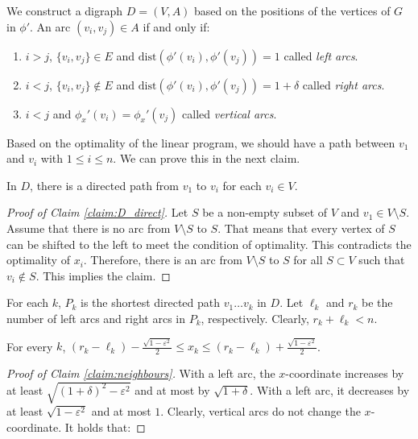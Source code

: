 {We construct a digraph $D = (V,A)$ based on the positions of the vertices of $G$ in $\phi'$. An arc $(v_i, v_j) \in A$ if and only if:

\begin{enumerate}
  \item $i > j$, $\{v_i, v_j\} \in E$ and $\text{dist}(\phi'(v_i), \phi'(v_j)) = 1$ called \emph{left arcs}.
  \item $i < j$, $\{v_i, v_j\} \notin E$ and $\text{dist}(\phi'(v_i), \phi'(v_j)) = 1 + \delta$ called \emph{right arcs}.
  \item $i < j$ and $\phi_x'(v_i) = \phi_x'(v_j)$ called \emph{vertical arcs}.
\end{enumerate}

Based on the optimality of the linear program, we should have a path between $v_1$ and $v_i$ with $1 \leq i \leqslant n$. We can prove this in the next claim.

\begin{claim}\label{claim:D_direct}
  In $D$, there is a directed path from $v_1$ to $v_i$ for each $v_i \in V$.
\end{claim}

\begin{proof}[Proof of Claim \ref{claim:D_direct}]
  Let $S$ be a non-empty subset of $V$ and $v_1 \in V \setminus S$. Assume that there is no arc from $V \setminus S$ to $S$. That means that every vertex of $S$ can be shifted to the left to meet the condition of optimality. This contradicts the optimality of $x_i$. Therefore, there is an arc from $V\setminus S$ to $S$ for all $S \subset V$ such that $v_i \notin S$. This implies the claim.
\end{proof}

For each $k$, $P_k$ is the shortest directed path $v_1 \dots v_k$ in $D$. Let $\ell_k$ and $r_k$ be the number of left arcs and right arcs in $P_k$, respectively. Clearly, $r_k + \ell_k < n$.

\begin{claim}\label{claim:neighbours}
  For every $k$, $(r_k - \ell_k) - \frac{\sqrt{1 - \varepsilon^2}}{2} \leqslant x_k \leqslant (r_k - \ell_k) + \frac{\sqrt{1 - \varepsilon^2}}{2}$.
\end{claim}

\begin{proof}[Proof of Claim \ref{claim:neighbours}]
  With a left arc, the $x$-coordinate increases by at least $\sqrt{(1 + \delta)^2 - \varepsilon^2}$ and at most by $\sqrt{1 + \delta}$. With a left arc, it decreases by at least $\sqrt{1 - \varepsilon^2}$ and at most $1$. Clearly, vertical arcs do not change the $x$-coordinate. It holds that:


\end{proof}}
